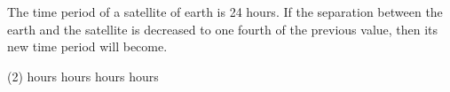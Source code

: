 \item The time period of a satellite of earth is 24 hours. If the separation between the earth and the satellite is decreased to one fourth of the previous value, then its new time period will become.
\begin{tasks}(2)
     hours
     hours
     hours
     hours
\end{tasks}